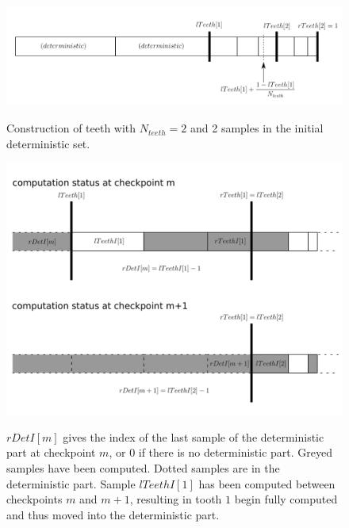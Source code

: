 \begin{figure}[h!]
	\begin{center}
		\includegraphics[width=1.00\columnwidth]{figures/pt2/teeths}
		\caption{\label{filtering}}
		Construction of teeth with $N_{teeth} = 2$ and 2 samples in the initial deterministic set.
	\end{center}
\end{figure}

\begin{figure}[h!]
	\begin{center}
		\includegraphics[width=1.00\columnwidth]{figures/matrix_dressing/deterministic_cp}
		\caption{\label{filtering}}
		$rDetI[m]$ gives the index of the last sample of the deterministic part at checkpoint $m$, or $0$ if there is no deterministic part.
		Greyed samples have been computed. Dotted samples are in the deterministic part. Sample $lTeethI[1]$ has been computed between checkpoints $m$ and $m+1$, resulting in tooth $1$ begin fully computed and thus moved into the deterministic part.
	\end{center}
\end{figure}